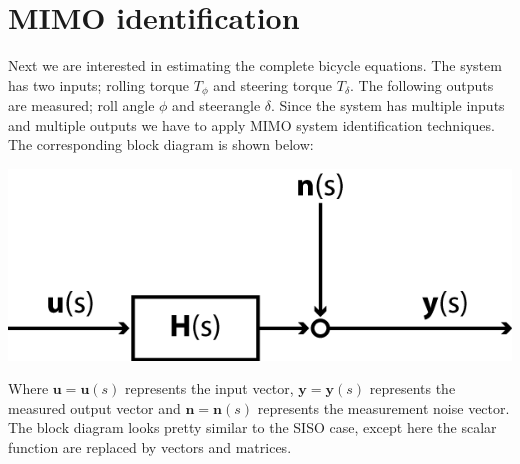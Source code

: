 \section{MIMO identification}
Next we are interested in estimating the complete bicycle equations. The system has two inputs; rolling torque $T_\phi$ and steering torque $T_\delta$. The following outputs are measured; roll angle $\phi$ and steerangle $\delta$. Since the system has multiple inputs and multiple outputs we have to apply MIMO system identification techniques. The corresponding block diagram is shown below:
	\begin{center}
		\includegraphics{images/MIMOblock}
		\label{fig:MIMOblock}
	\end{center}
Where $\mathbf{u} = \mathbf{u}(s)$ represents the input vector, $\mathbf{y}= \mathbf{y}(s)$ represents the measured output vector and $\mathbf{n} = \mathbf{n}(s)$ represents the measurement noise vector. The block diagram looks pretty similar to the SISO case, except here the scalar function are replaced by vectors and matrices.
